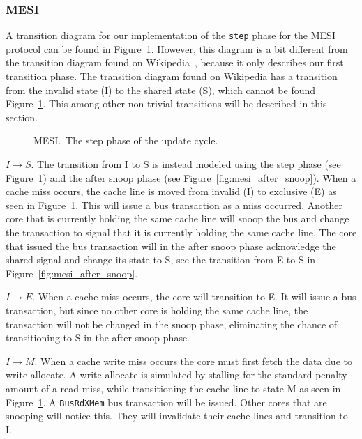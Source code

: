 \subsubsection{MESI}

A transition diagram for our implementation of the \texttt{step} phase for the MESI protocol can be found in Figure~\ref{fig:mesi}.
However, this diagram is a bit different from the transition diagram found on
Wikipedia~\cite{mesi_wiki}, because it only describes our first transition phase.
The transition diagram found on Wikipedia has a transition from the invalid state (I) to the shared
state (S), which cannot be found Figure~\ref{fig:mesi}.
This among other non-trivial transitions will be described in this section.


\begin{figure}[ht]
    \centering
    \caption{MESI.\ The step phase of the update cycle.}\label{fig:mesi}
\end{figure}

$I \to S$.
The transition from I to S is instead modeled using the step phase (see Figure~\ref{fig:mesi}) and the after snoop phase (see Figure~\ref{fig:mesi_after_snoop}).
When a cache miss occurs, the cache line is moved from invalid (I) to exclusive (E) as seen in Figure~\ref{fig:mesi}.
This will issue a bus transaction as a miss occurred.
Another core that is currently holding the same cache line will snoop the bus and change the transaction to signal that it is currently holding the same cache line.
The core that issued the bus transaction will in the after snoop phase acknowledge the shared signal and change its state to S, see the transition from E to S in Figure~\ref{fig:mesi_after_snoop}.

$I \to E$.
When a cache miss occurs, the core will transition to E.
It will issue a bus transaction, but since no other core is holding the same cache line, the transaction will not be changed in the snoop phase, eliminating the chance of transitioning to S in the after snoop phase.

$I \to M$.
When a cache write miss occurs the core must first fetch the data due to write-allocate.
A write-allocate is simulated by stalling for the standard penalty amount of a read miss, while transitioning the cache line to state M as seen in Figure~\ref{fig:mesi}.
A \texttt{BusRdXMem} bus transaction will be issued.
Other cores that are snooping will notice this.
They will invalidate their cache lines and transition to I.

